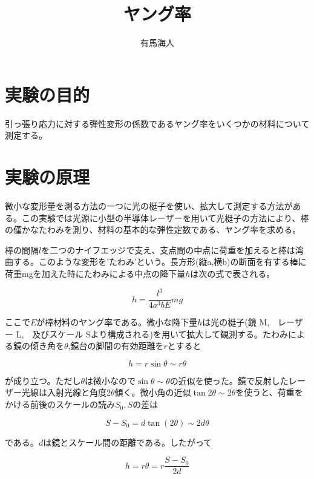 \documentclass{jsarticle}
\begin{document}
\title{ヤング率}
\author{有馬海人}
\maketitle


\section{実験の目的}


引っ張り応力に対する弾性変形の係数であるヤング率をいくつかの材料について測定する。

\section{実験の原理}

微小な変形量を測る方法の一つに光の梃子を使い、拡大して測定する方法がある。この実験では光源に小型の半導体レーザーを用いて光梃子の方法により、棒の僅かなたわみを測り、材料の基本的な弾性定数である、ヤング率を求める。\\
\par 棒の間隔$l$を二つのナイフエッジで支え、支点間の中点に荷重を加えると棒は湾曲する。このような変形を’たわみ’という。長方形(縦a,横b)の断面を有する棒に荷重mgを加えた時にたわみによる中点の降下量$h$は次の式で表される。

\begin{equation}
    h = \frac{l^3}{4a^3bE}mg
\end{equation}

ここで$E$が棒材料のヤング率である。微小な降下量$h$は光の梃子(鏡 M,　レーザー L,　及びスケール Sより構成される)を用いて拡大して観測する。たわみによる鏡の傾き角を$\theta$,鏡台の脚間の有効距離を$r$とすると


\begin{equation}
    h = r\sin \theta \sim r\theta
\end{equation}

が成り立つ。ただし$\theta$は微小なので$\sin \theta \sim \theta$の近似を使った。鏡で反射したレーザー光線は入射光線と角度$2\theta$傾く。微小角の近似$\tan 2\theta \sim 2\theta $を使うと、荷重をかける前後のスケールの読み$S_0,S$の差は

\begin{equation}
    S - S_0 = d \tan(2\theta) \sim 2d\theta
\end{equation}

である。$d$は鏡とスケール間の距離である。したがって

\begin{equation}
    h = r\theta = r\frac{S - S_0}{2d}
\end{equation}
\end{document}
